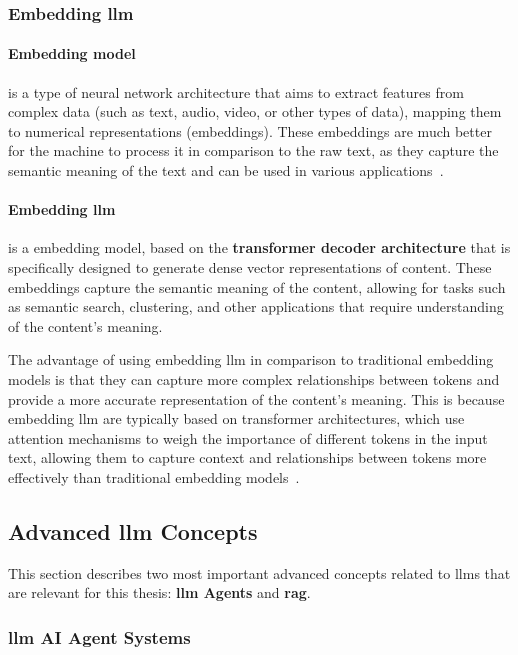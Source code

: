 \subsubsection{Embedding \gls{llm}}\label{sec:embedding-models}

\paragraph{Embedding model}
is a type of neural network architecture that aims to extract features from
complex data (such as text, audio, video, or other types of data), mapping them
to numerical representations (embeddings). These embeddings are much better for
the machine to process it in comparison to the raw text, as they capture the
semantic meaning of the text and can be used in various
applications~\cite{nie2025textembeddingmeetslarge}.

\paragraph{Embedding \gls{llm}} 
is a embedding model, based on the \textbf{transformer decoder architecture}
that is specifically designed to generate dense vector representations of
content. These embeddings capture the semantic meaning of the content, allowing
for tasks such as semantic search, clustering, and other applications that
require understanding of the content's meaning.

The advantage of using embedding \gls{llm} in comparison to traditional
embedding models is that they can capture more complex relationships between
tokens and provide a more accurate representation of the content's meaning. This
is because embedding \gls{llm} are typically based on transformer architectures,
which use attention mechanisms to weigh the importance of different tokens in
the input text, allowing them to capture context and relationships between
tokens more effectively than traditional embedding
models~\cite{zhang2024systematicsurveytextsummarization,khan2026retrieval}.

\subsection{Advanced \gls{llm} Concepts}

This section describes two most important advanced concepts related to
\glspl{llm} that are relevant for this thesis: \textbf{\gls{llm} Agents} and
\textbf{\gls{rag}}.

\subsubsection{\gls{llm} AI Agent Systems}\label{agent}


